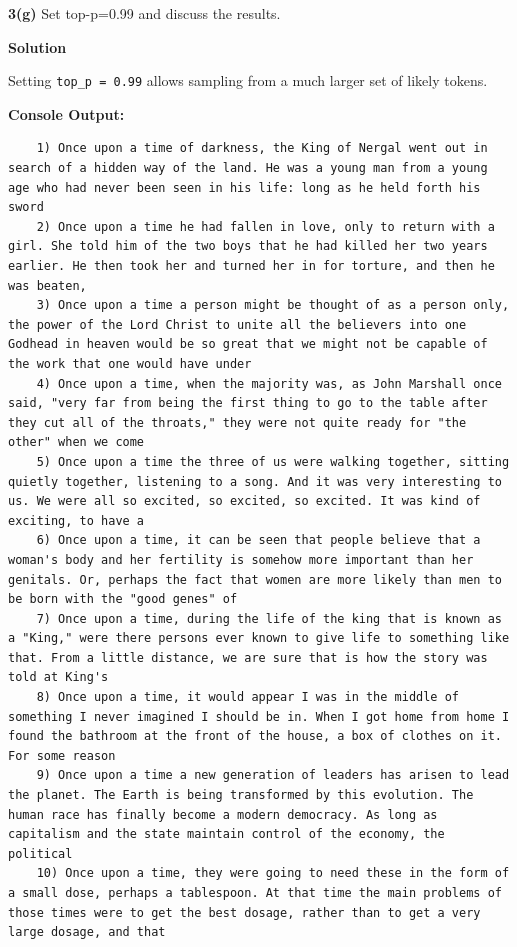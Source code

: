 \documentclass[10pt]{article}
\begin{document}
\textbf{3(g)} Set top-p=0.99 and discuss the results.

\textbf{Solution}

Setting \texttt{top\_p = 0.99} allows sampling from a much larger set of likely tokens.

\textbf{Console Output:}
\begin{lstlisting}
	1) Once upon a time of darkness, the King of Nergal went out in search of a hidden way of the land. He was a young man from a young age who had never been seen in his life: long as he held forth his sword
	2) Once upon a time he had fallen in love, only to return with a girl. She told him of the two boys that he had killed her two years earlier. He then took her and turned her in for torture, and then he was beaten,
	3) Once upon a time a person might be thought of as a person only, the power of the Lord Christ to unite all the believers into one Godhead in heaven would be so great that we might not be capable of the work that one would have under
	4) Once upon a time, when the majority was, as John Marshall once said, "very far from being the first thing to go to the table after they cut all of the throats," they were not quite ready for "the other" when we come
	5) Once upon a time the three of us were walking together, sitting quietly together, listening to a song. And it was very interesting to us. We were all so excited, so excited, so excited. It was kind of exciting, to have a
	6) Once upon a time, it can be seen that people believe that a woman's body and her fertility is somehow more important than her genitals. Or, perhaps the fact that women are more likely than men to be born with the "good genes" of
	7) Once upon a time, during the life of the king that is known as a "King," were there persons ever known to give life to something like that. From a little distance, we are sure that is how the story was told at King's
	8) Once upon a time, it would appear I was in the middle of something I never imagined I should be in. When I got home from home I found the bathroom at the front of the house, a box of clothes on it. For some reason
	9) Once upon a time a new generation of leaders has arisen to lead the planet. The Earth is being transformed by this evolution. The human race has finally become a modern democracy. As long as capitalism and the state maintain control of the economy, the political
	10) Once upon a time, they were going to need these in the form of a small dose, perhaps a tablespoon. At that time the main problems of those times were to get the best dosage, rather than to get a very large dosage, and that
\end{lstlisting}
\end{document}
